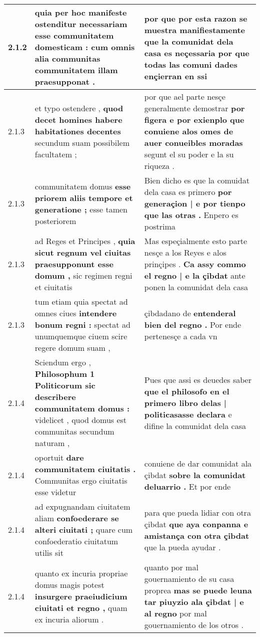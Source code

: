 \begin{tabular}{|p{1cm}|p{6.5cm}|p{6.5cm}|}
2.1.2 & quia per hoc manifeste ostenditur \textbf{ necessariam esse communitatem domesticam : } cum omnis alia communitas communitatem illam praesupponat . & por que por esta razon se muestra manifiestamente \textbf{ que la comunidat dela casa es neçessaria } por que todas las comuni dades ençierran en ssi \\\hline
2.1.3 & et typo ostendere , \textbf{ quod decet homines habere habitationes decentes } secundum suam possibilem facultatem ; & por que ael parte nesçe generalmente demostrar \textbf{ por figera e por exienplo que conuiene alos omes de auer conueibles moradas } segunt el su poder e la su riqueza . \\\hline
2.1.3 & communitatem domus \textbf{ esse priorem aliis tempore et generatione ; } esse tamen posteriorem & Bien dicho es que la comuidat dela casa es primero \textbf{ por generaçion | e por tienpo que las otras . } Enpero es postrima \\\hline
2.1.3 & ad Reges et Principes , \textbf{ quia sicut regnum vel ciuitas praesupponunt esse domum , } sic regimen regni et ciuitatis & Mas espeçialmente esto parte nesçe a los Reyes e alos prinçipes . \textbf{ Ca assy commo el regno | e la çibdat } ante ponen la comunidat dela casa \\\hline
2.1.3 & tum etiam quia spectat ad omnes ciues \textbf{ intendere bonum regni : } spectat ad unumquemque ciuem scire regere domum suam , & çibdadano de \textbf{ entenderal bien del regno . } Por ende pertenesçe a cada vn \\\hline
2.1.4 & Sciendum ergo , \textbf{ Philosophum 1 Politicorum sic describere communitatem domus : } videlicet , quod domus est communitas secundum naturam , & Pues que assi es deuedes saber \textbf{ que el philosofo en el primero libro delas | politicasasse declara } e difine la comunidat dela casa \\\hline
2.1.4 & oportuit \textbf{ dare communitatem ciuitatis . } Communitas ergo ciuitatis esse videtur & conuiene de dar comunidat ala çibdat \textbf{ sobre la comunidat deluarrio . } Et por ende \\\hline
2.1.4 & ad expugnandam ciuitatem aliam \textbf{ confoederare se alteri ciuitati ; } quare cum confoederatio ciuitatum utilis sit & para que pueda lidiar con otra çibdat \textbf{ que aya conpanna e amistança con otra çibdat } que la pueda ayudar . \\\hline
2.1.4 & quanto ex incuria propriae domus magis potest \textbf{ insurgere praeiudicium ciuitati et regno , } quam ex incuria aliorum . & quanto por mal gouernamiento de su casa proprea \textbf{ mas se puede leuna tar piuyzio ala çibdat | e al regno } por mal gouernamiento de los otros . \\\hline

\end{tabular}
